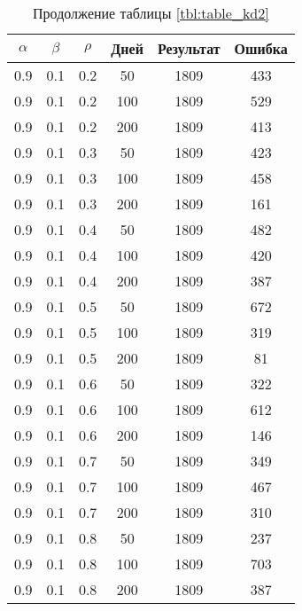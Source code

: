 \begin{table}[h]
	\begin{center}
        \captionsetup{justification=raggedright,singlelinecheck=off}
		\caption*{Продолжение таблицы \ref{tbl:table_kd2}}
		\begin{tabular}{|c|c|c|c|c|c|}
  	\hline
	$\alpha$ & $\beta$ & $\rho$ & Дней & Результат & Ошибка \\\hline
		0.9 &  0.1 &  0.2 &   50 &  1809 &   433 \\
		0.9 &  0.1 &  0.2 &  100 &  1809 &   529 \\
		0.9 &  0.1 &  0.2 &  200 &  1809 &   413 \\
	   \hline
		0.9 &  0.1 &  0.3 &   50 &  1809 &   423 \\
		0.9 &  0.1 &  0.3 &  100 &  1809 &   458 \\
		0.9 &  0.1 &  0.3 &  200 &  1809 &   161 \\
	   \hline
		0.9 &  0.1 &  0.4 &   50 &  1809 &   482 \\
		0.9 &  0.1 &  0.4 &  100 &  1809 &   420 \\
		0.9 &  0.1 &  0.4 &  200 &  1809 &   387 \\
	   \hline
		0.9 &  0.1 &  0.5 &   50 &  1809 &   672 \\
		0.9 &  0.1 &  0.5 &  100 &  1809 &   319 \\
		0.9 &  0.1 &  0.5 &  200 &  1809 &    81 \\
	   \hline
		0.9 &  0.1 &  0.6 &   50 &  1809 &   322 \\
		0.9 &  0.1 &  0.6 &  100 &  1809 &   612 \\
		0.9 &  0.1 &  0.6 &  200 &  1809 &   146 \\
	   \hline
		0.9 &  0.1 &  0.7 &   50 &  1809 &   349 \\
		0.9 &  0.1 &  0.7 &  100 &  1809 &   467 \\
		0.9 &  0.1 &  0.7 &  200 &  1809 &   310 \\
	   \hline
		0.9 &  0.1 &  0.8 &   50 &  1809 &   237 \\
		0.9 &  0.1 &  0.8 &  100 &  1809 &   703 \\
		0.9 &  0.1 &  0.8 &  200 &  1809 &   387 \\
	   \hline
		\end{tabular}
	\end{center}
\end{table}